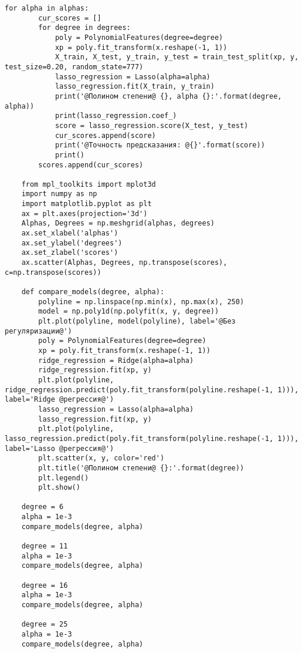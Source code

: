 \begin{lstlisting}[label=lst:1,caption=Обучение модели полиномиальной регрессии с регуляризацией]
	for alpha in alphas:
		cur_scores = []
		for degree in degrees:
			poly = PolynomialFeatures(degree=degree)
			xp = poly.fit_transform(x.reshape(-1, 1))
			X_train, X_test, y_train, y_test = train_test_split(xp, y, test_size=0.20, random_state=777)
			lasso_regression = Lasso(alpha=alpha)
			lasso_regression.fit(X_train, y_train)
			print('@Полином степени@ {}, alpha {}:'.format(degree, alpha))
			print(lasso_regression.coef_)
			score = lasso_regression.score(X_test, y_test)
			cur_scores.append(score)
			print('@Точность предсказания: @{}'.format(score))
			print()
		scores.append(cur_scores)
	
	from mpl_toolkits import mplot3d
	import numpy as np
	import matplotlib.pyplot as plt
	ax = plt.axes(projection='3d')
	Alphas, Degrees = np.meshgrid(alphas, degrees)
	ax.set_xlabel('alphas')
	ax.set_ylabel('degrees')
	ax.set_zlabel('scores')
	ax.scatter(Alphas, Degrees, np.transpose(scores), c=np.transpose(scores))
	
	def compare_models(degree, alpha):
		polyline = np.linspace(np.min(x), np.max(x), 250)
		model = np.poly1d(np.polyfit(x, y, degree))
		plt.plot(polyline, model(polyline), label='@Без регуляризации@')
		poly = PolynomialFeatures(degree=degree)
		xp = poly.fit_transform(x.reshape(-1, 1))
		ridge_regression = Ridge(alpha=alpha)
		ridge_regression.fit(xp, y)
		plt.plot(polyline, ridge_regression.predict(poly.fit_transform(polyline.reshape(-1, 1))), label='Ridge @регрессия@')
		lasso_regression = Lasso(alpha=alpha)
		lasso_regression.fit(xp, y)
		plt.plot(polyline, lasso_regression.predict(poly.fit_transform(polyline.reshape(-1, 1))), label='Lasso @регрессия@')
		plt.scatter(x, y, color='red')
		plt.title('@Полином степени@ {}:'.format(degree))
		plt.legend()
		plt.show()
	
	degree = 6
	alpha = 1e-3
	compare_models(degree, alpha)
	
	degree = 11
	alpha = 1e-3
	compare_models(degree, alpha)
	
	degree = 16
	alpha = 1e-3
	compare_models(degree, alpha)
	
	degree = 25
	alpha = 1e-3
	compare_models(degree, alpha)
\end{lstlisting}

\clearpage
